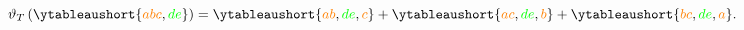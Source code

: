 \documentclass[crop,equation,convert={outext=.svg,command=\unexpanded{pdf2svg \infile\space\outfile}},multi=false]{standalone}
\begin{document}
\color{white}\Huge\boldmath
{} 
$\vartheta_T\left(\ytableaushort{{\color{orange}a}{\color{orange}b}{\color{orange}c},{\color{green}d}{\color{green}e}}\right) = \ytableaushort{{\color{orange}a}{\color{orange}b},{\color{green}d}{\color{green}e},{\color{orange}c}}+\ytableaushort{{\color{orange}a}{\color{orange}c},{\color{green}d}{\color{green}e},{\color{orange}b}}+\ytableaushort{{\color{orange}b}{\color{orange}c},{\color{green}d}{\color{green}e},{\color{orange}a}}.$
\end{document}
